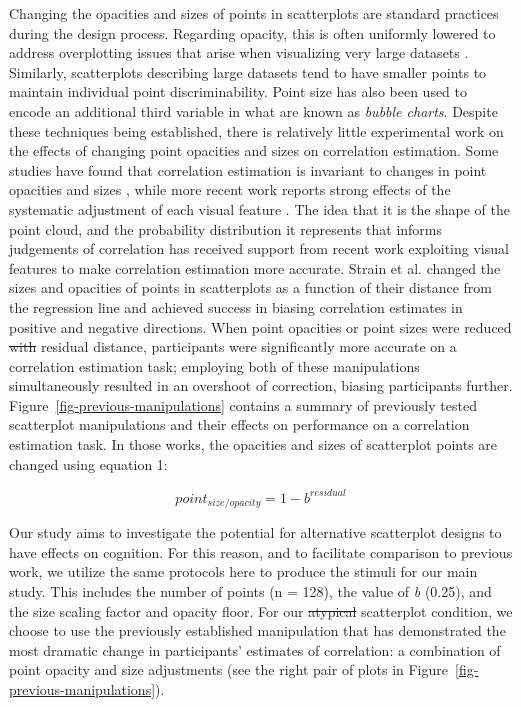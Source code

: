 \documentclass[manuscript,screen,review,anonymous]{acmart}
\providecommand{\DIFaddtex}[1]{{\protect\color{blue}\uwave{#1}}} %
\providecommand{\DIFdeltex}[1]{{\protect\color{red}\sout{#1}}} %
\providecommand{\DIFaddbegin}{} %
\providecommand{\DIFaddend}{} %
\providecommand{\DIFdelbegin}{} %
\providecommand{\DIFdelend}{} %
\providecommand{\DIFadd}[1]{\texorpdfstring{\DIFaddtex{#1}}{#1}} %
\providecommand{\DIFdel}[1]{\texorpdfstring{\DIFdeltex{#1}}{}} %
\newcommand{\DIFscaledelfig}{0.5}
\newlength{\DIFdelgraphicswidth} %
\newlength{\DIFdelgraphicsheight} %
\newcommand{\DIFaddincludegraphics}[2][]{{\color{blue}\fbox{\DIFOincludegraphics[#1]{#2}}}} %
\newcommand{\DIFdelincludegraphics}[2][]{%
\sbox{\DIFdelgraphicsbox}{\DIFOincludegraphics[#1]{#2}}%
\settoboxwidth{\DIFdelgraphicswidth}{\DIFdelgraphicsbox} %
\settoboxtotalheight{\DIFdelgraphicsheight}{\DIFdelgraphicsbox} %
\scalebox{\DIFscaledelfig}{%
\parbox[b]{\DIFdelgraphicswidth}{\usebox{\DIFdelgraphicsbox}\\[-\baselineskip] \rule{\DIFdelgraphicswidth}{0em}}\llap{\resizebox{\DIFdelgraphicswidth}{\DIFdelgraphicsheight}{%
\setlength{\unitlength}{\DIFdelgraphicswidth}%
\begin{picture}(1,1)%
\thicklines\linethickness{2pt} %
{\color[rgb]{1,0,0}\put(0,0){\framebox(1,1){}}}%
{\color[rgb]{1,0,0}\put(0,0){\line( 1,1){1}}}%
{\color[rgb]{1,0,0}\put(0,1){\line(1,-1){1}}}%
\end{picture}%
}\hspace*{3pt}}} %
} %
\DeclareRobustCommand{\DIFaddbegin}{\DIFOaddbegin \let\includegraphics\DIFaddincludegraphics} %
\DeclareRobustCommand{\DIFaddend}{\DIFOaddend \let\includegraphics\DIFOincludegraphics} %
\DeclareRobustCommand{\DIFdelbegin}{\DIFOdelbegin \let\includegraphics\DIFdelincludegraphics} %
\DeclareRobustCommand{\DIFdelend}{\DIFOaddend \let\includegraphics\DIFOincludegraphics} %
\begin{document}
Changing the opacities and sizes of points in scatterplots are standard
practices during the design process. Regarding opacity, this is often
uniformly lowered to address overplotting issues that arise when
visualizing very large datasets \citep{matejka_2015}. Similarly,
scatterplots describing large datasets tend to have smaller points to
maintain individual point discriminability. Point size has also been
used to encode an additional third variable in what are known as
\emph{bubble charts}. Despite these techniques being established, there
is relatively little experimental work on the effects of changing point
opacities and sizes on correlation estimation. Some studies have found
that correlation estimation is invariant to changes in point opacities
and sizes \citep{rensink_2014, rensink_2017}, while more recent work
reports strong effects of the systematic adjustment of each visual
feature \citep{strain_2023, strain_2023b, strain_2024}. The idea that it
is the shape of the point cloud, and the probability distribution it
represents that informs judgements of correlation has received support
from recent work exploiting visual features to make correlation
estimation more accurate. Strain et al.
\citep{strain_2023, strain_2023b, strain_2024} changed the sizes and
opacities of points in scatterplots as a function of their distance from
the regression line and achieved success in biasing correlation
estimates in positive and negative directions. When point opacities
\citep{strain_2023} or point sizes \citep{strain_2023b} were reduced \DIFdelbegin \DIFdel{with }\DIFdelend \DIFaddbegin \DIFadd{as
a function of }\DIFaddend residual distance, participants were significantly more
accurate on a correlation estimation task; employing both of these
manipulations simultaneously \citep{strain_2024} resulted in an
overshoot of correction, biasing participants further.
Figure~\ref{fig-previous-manipulations} contains a summary of previously
tested scatterplot manipulations and their effects on performance on a
correlation estimation task. In those works, the opacities and sizes of
scatterplot points are changed using equation 1:

\begin{equation}
  point_{size/opacity} = 1 - b^{residual}
\end{equation}

Our study aims to investigate the potential for alternative scatterplot
designs to have effects on cognition. For this reason, and to facilitate
comparison to previous work, we utilize the same protocols here to
produce the stimuli for our main study. This includes the number of
points (n = 128), the value of \emph{b} (0.25), and the size scaling
factor and opacity floor. For our \DIFdelbegin \DIFdel{atypical }\DIFdelend \DIFaddbegin \DIFadd{alternative }\DIFaddend scatterplot condition, we
choose to use the previously established manipulation that has
demonstrated the most dramatic change in participants' estimates of
correlation: a combination of point opacity and size adjustments
\citep{strain_2024} (see the right pair of plots in
Figure~\ref{fig-previous-manipulations}).
\end{document}
